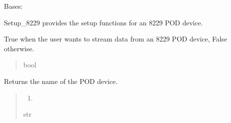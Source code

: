 \documentclass[letterpaper,10pt,english]{sphinxmanual}
\begin{document}
\begin{fulllineitems}
\label{\detokenize{Setup_8229:Setup_8229.Setup_8229}}
\pysigstartsignatures
{}
\pysigstopsignatures
\sphinxAtStartPar
Bases: {\hyperref[\detokenize{Setup_PodInterface:Setup_PodInterface.Setup_Interface}]{}}

\sphinxAtStartPar
Setup\_8229 provides the setup functions for an 8229 POD device.

\begin{fulllineitems}
\label{\detokenize{Setup_8229:Setup_8229.Setup_8229._streamMode}}
\pysigstartsignatures
{}
\pysigstopsignatures
\sphinxAtStartPar
True when the user wants to stream data from an 8229 POD             device, False otherwise.
\begin{quote}\begin{description}
\sphinxAtStartPar
bool

\end{description}\end{quote}

\end{fulllineitems}


\begin{fulllineitems}
\label{\detokenize{Setup_8229:Setup_8229.Setup_8229.GetDeviceName}}
\pysigstartsignatures
{}
\pysigstopsignatures
\sphinxAtStartPar
Returns the name of the POD device.
\begin{quote}\begin{description}
\sphinxAtStartPar
\begin{enumerate}
%
\setcounter{enumi}{8228}
\item {} 
\end{enumerate}


\sphinxAtStartPar
str


\end{description}
\end{quote}
\end{fulllineitems}
\end{fulllineitems}
\end{document}
